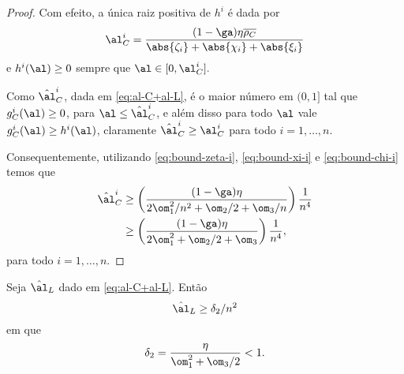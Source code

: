 \begin{proof}
Com efeito, a única raiz positiva de $h^i$ é dada por
\[
\al_{C}^i = \dfrac{(1-\ga)\eta\dbvec{\rho_C}}{\abs{\zeta_i} + \abs{\chi_i} + \abs{\xi_i}}
\]
e $h^i(\al)\geq 0$ sempre que $\al\in[0,\al_{C}^i].$ 

Como $\nextal^{i}_{C}$, dada em \eqref{eq:al-C+al-L}, é o maior número em $(0,1]$ tal que $g_{C}^{i}(\al)\geq 0$, para $\al\leq\nextal^{i}_{C}$, e além disso para todo $\al$ vale $g_{C}^{i}(\al) \geq h^{i}(\al)$, claramente $\nextal^{i}_{C} \geq  \al_{C}^i$ para todo $i=1,\ldots,n$.

Consequentemente, utilizando \eqref{eq:bound-zeta-i}, \eqref{eq:bound-xi-i} e \eqref{eq:bound-chi-i} temos que 
\[
\begin{aligned}
\nextal_{C}^i & \geq \left(\dfrac{(1-\ga)\eta}{2\om_{1}^{2}/n^{2} + \om_{2}/2 + \om_{3}/n  }\right)\dfrac{1}{n^{4}} \\			  & \geq \left(\dfrac{(1-\ga)\eta}{2\om_{1}^{2} + \om_{2}/2 + \om_{3}  }\right)\dfrac{1}{n^{4}},
\end{aligned}
\]
 para todo $i=1,\ldots,n$. 
 \end{proof}






\begin{lema}\label{lemma:alL_delta-2}
Seja $\nextal_{L}$ dado em \eqref{eq:al-C+al-L}. Então 
\[
\nextal_{L} \geq \delta_{2}/n^{2}
\]
em que 
\[
\delta_{2} = \frac{\eta }{\om_{1}^{2} + \om_{3}/2} < 1.
\]
\end{lema}


